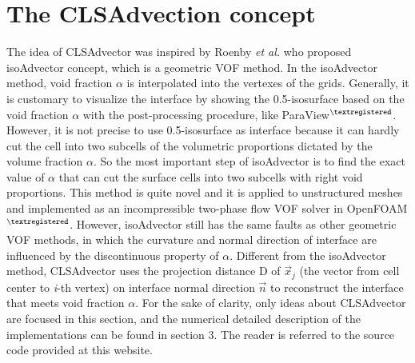 \section{The CLSAdvection concept}
The idea of CLSAdvector was inspired by Roenby \textit{et al.} who proposed isoAdvector concept\cite{isoAdvector}, which is a geometric VOF method. In the isoAdvector method, void fraction $\alpha$ is interpolated into the vertexes of the grids. Generally, it is customary to visualize the interface by showing the 0.5-isosurface based on the void fraction $\alpha$ with the post-processing procedure, like ParaView$^{\textregistered}$. However, it is not precise to use 0.5-isosurface as interface because it can hardly cut the cell into two subcells of the volumetric proportions dictated by the volume fraction $\alpha$. So the most important step of isoAdvector is to find the exact value of $\alpha$ that can cut the surface cells into two subcells with right void proportions. This method is quite novel and it is applied to unstructured meshes and implemented as an incompressible two-phase flow VOF solver in OpenFOAM$^{\textregistered}$. However, isoAdvector still has the same faults as other geometric VOF methods, in which the curvature and normal direction of interface are influenced by the discontinuous property of $\alpha$. Different from the isoAdvector method, CLSAdvector uses the projection distance D of $\vec{x}_j$ (the vector from cell center to \textit{i}-th vertex) on interface normal direction $\vec{n}$ to reconstruct the interface that meets void fraction $\alpha$. For the sake of clarity, only ideas about CLSAdvector are focused in this section, and the numerical detailed description of the implementations can be found in section 3. The reader is referred to the source code provided at this website\cite{CLSAdvector}.
